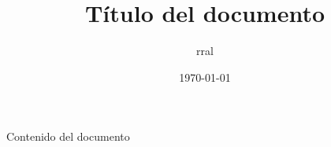 \documentclass{article}
\title{Título del documento}
\author{rral}
\date{\today}
\begin{document}
\maketitle

Contenido del documento
\end{document}

